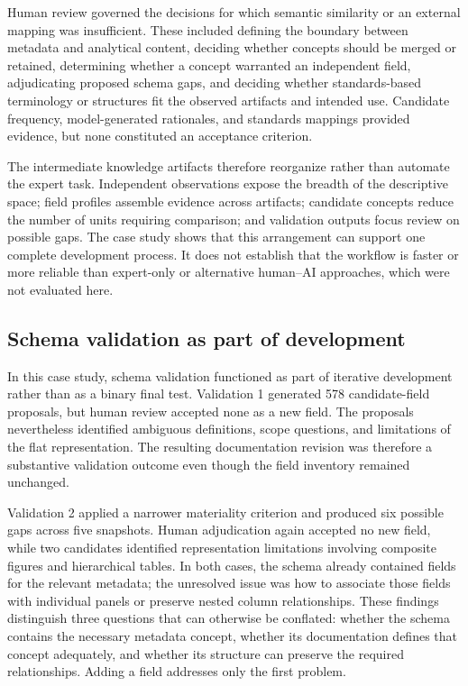 \documentclass{article}
\begin{document}
Human review governed the decisions for which semantic similarity or an external mapping was insufficient. These included defining the boundary between metadata and analytical content, deciding whether concepts should be merged or retained, determining whether a concept warranted an independent field, adjudicating proposed schema gaps, and deciding whether standards-based terminology or structures fit the observed artifacts and intended use. Candidate frequency, model-generated rationales, and standards mappings provided evidence, but none constituted an acceptance criterion.

The intermediate knowledge artifacts therefore reorganize rather than automate the expert task. Independent observations expose the breadth of the descriptive space; field profiles assemble evidence across artifacts; candidate concepts reduce the number of units requiring comparison; and validation outputs focus review on possible gaps. The case study shows that this arrangement can support one complete development process. It does not establish that the workflow is faster or more reliable than expert-only or alternative human--AI approaches, which were not evaluated here.

\subsection{Schema validation as part of development}

In this case study, schema validation functioned as part of iterative development rather than as a binary final test. Validation 1 generated 578 candidate-field proposals, but human review accepted none as a new field. The proposals nevertheless identified ambiguous definitions, scope questions, and limitations of the flat representation. The resulting documentation revision was therefore a substantive validation outcome even though the field inventory remained unchanged.

Validation 2 applied a narrower materiality criterion and produced six possible gaps across five snapshots. Human adjudication again accepted no new field, while two candidates identified representation limitations involving composite figures and hierarchical tables. In both cases, the schema already contained fields for the relevant metadata; the unresolved issue was how to associate those fields with individual panels or preserve nested column relationships. These findings distinguish three questions that can otherwise be conflated: whether the schema contains the necessary metadata concept, whether its documentation defines that concept adequately, and whether its structure can preserve the required relationships. Adding a field addresses only the first problem.
\end{document}
